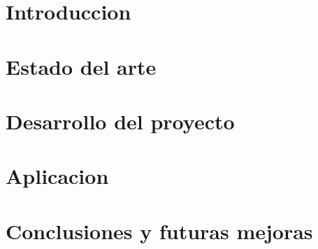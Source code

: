 \documentclass[a4paper,12pt,spanish]{book}
\begin{document}
\renewcommand{\figurename}{Figura}
\renewcommand{\listfigurename}{Indice de figuras}
\renewcommand{\tablename}{Tabla}
\renewcommand{\listtablename}{Indice de tablas}

\pagestyle{empty}

\cleardoublepage


\cleardoublepage
\pagestyle{plain}

\frontmatter %


\cleardoublepage

\tableofcontents
\listoffigures
\listoftables

\mainmatter %
\nocite{*}
\chapter{Introduccion}


\chapter{Estado del arte}


\chapter{Desarrollo del proyecto}


\chapter{Aplicacion}


\chapter{Conclusiones y futuras mejoras}



\backmatter %


\clearpage




%
\end{document}

